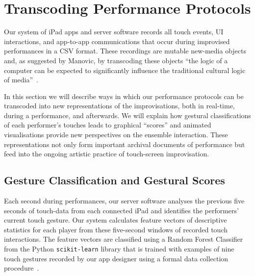 \documentclass[graybox]{svmult}
\begin{document}
\section{Transcoding Performance Protocols}
\label{sec:analysis}

Our system of iPad apps and server software records all touch events,
UI interactions, and app-to-app communications that occur during
improvised performances in a CSV format. These
recordings are mutable new-media objects and, as suggested by Manovic,
by transcoding these objects ``the logic of a computer can be expected
to significantly influence the traditional cultural logic of
media''~\cite{Manovich:2002ly}.

In this section we will describe ways in which our performance
protocols can be transcoded into new representations of the
improvisations, both in real-time, during a performance, and
afterwards. We will explain how gestural classifications of each
performer's touches leads to graphical ``scores'' and animated
visualisations provide new perspectives on the ensemble interaction.
These representations not only form important archival documents of
performance but feed into the ongoing artistic practice of
touch-screen improvisation.


\subsection{Gesture Classification and Gestural Scores}
\label{subsec:gesture-classification}

Each second during performances, our server software analyses the
previous five seconds of touch-data from each connected iPad and
identifies the performers' current touch gesture. Our system
calculates feature vectors of descriptive statistics for each player
from these five-second windows of recorded touch interactions. The
feature vectors are classified using a Random Forest
Classifier~\cite{Breiman:2001kx} from the Python \texttt{scikit-learn}
library that is trained with examples of nine touch gestures recorded
by our app designer using a formal data collection
procedure~\cite{Martin:2015jk}. 
\end{document}

